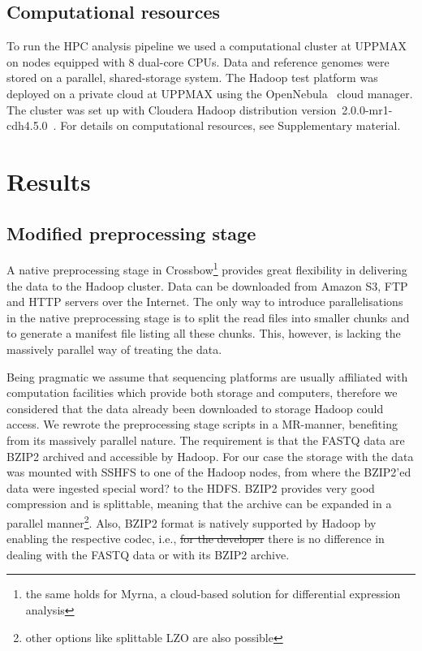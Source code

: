 \documentclass[11pt, oneside]{article}   	%
\newcommand{\COMMENT}[1]{{\color{red} #1 }}
\begin{document}
\subsection{Computational resources}
To run the HPC analysis pipeline we used a computational cluster at UPPMAX on nodes equipped with 8 dual-core CPUs. Data and reference genomes were stored on a parallel, shared-storage system\cite{gulo}. The Hadoop test platform was deployed on a private cloud at UPPMAX using the OpenNebula~\cite{opennebula} cloud manager. The cluster was set up with Cloudera Hadoop distribution version~2.0.0-mr1-cdh4.5.0~\cite{cloudera}. For details on computational resources, see Supplementary material.





\section{Results}
\label{sectionIII}

\subsection{Modified preprocessing stage}
A native preprocessing stage in Crossbow\footnote{the same holds for Myrna, a cloud-based solution for differential expression analysis} provides great flexibility in delivering the data to the Hadoop cluster. Data can be downloaded from Amazon S3, FTP and HTTP servers over the Internet\cite{crossbow}. The only way to introduce parallelisations in the native preprocessing stage is to split the read files into smaller chunks and to generate a manifest file listing all these chunks. This, however, is lacking the massively parallel way of treating the data.

Being pragmatic we assume that sequencing platforms are usually affiliated with computation facilities which provide both storage and computers, therefore we considered that the data already been downloaded to storage Hadoop could access.
We rewrote the preprocessing stage scripts in a MR-manner, benefiting from its massively parallel nature.
The requirement is that the FASTQ data are BZIP2 archived and accessible by Hadoop. For our case the storage with the data was mounted with SSHFS to one of the Hadoop nodes, from where the BZIP2'ed data were ingested \COMMENT{special word?} to the HDFS.
BZIP2 provides very good compression and is splittable, meaning that the archive can be expanded in a parallel manner\footnote{other options like splittable LZO are also possible}. Also, BZIP2 format is natively supported by Hadoop by enabling the respective codec, i.e., \sout{for the developer} there is no difference in dealing with the FASTQ data or with its BZIP2 archive.
\end{document}
